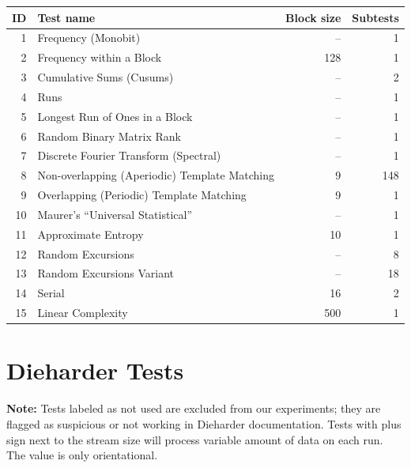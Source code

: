\documentclass[
	digital,    %
	oneside,    %
	color,
	11pt,
	nocover,
	notable,
	nolof,
	nolot,
]{fithesis3}
\theoremstyle{definition}
\theoremstyle{remark}
\begin{document}
\begin{nomar}
\centering
\begin{tabular}{@{}rlrr@{}} \toprule
\textbf{ID} & \textbf{Test name} & \textbf{Block size} & \textbf{Subtests} \\ \midrule
1  & Frequency (Monobit)                           & --  & 1 \\
2  & Frequency within a Block                      & 128 & 1 \\
3  & Cumulative Sums (Cusums)	                   & --  & 2 \\
4  & Runs                                          & --  & 1 \\
5  & Longest Run of Ones in a Block                & --  & 1 \\
6  & Random Binary Matrix Rank                     & --  & 1 \\
7  & Discrete Fourier Transform (Spectral)         & --  & 1 \\
8  & Non-overlapping (Aperiodic) Template Matching & 9   & 148 \\
9  & Overlapping (Periodic) Template Matching      & 9   & 1 \\
10 & Maurer's “Universal Statistical” 	           & --  & 1 \\
11 & Approximate Entropy 	                       & 10  & 1 \\
12 & Random Excursions 	                           & --  & 8 \\
13 & Random Excursions Variant	                   & --  & 18 \\
14 & Serial                                        & 16  & 2 \\
15 & Linear Complexity	                           & 500 & 1 \\ \bottomrule
\end{tabular}
\end{nomar}

\chapter{Dieharder Tests}
\label{app:dieharder_tests}
\textbf{Note:} Tests labeled as not used are excluded from our experiments; they are flagged as suspicious or not working in Dieharder documentation. Tests with plus sign next to the stream size will process variable amount of data on each run. The value is only orientational.
\end{document}
